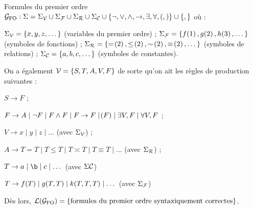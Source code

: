 \documentclass[a4paper,french,bookmarks]{book}
\begin{document}
    
    \begin{example}{Formules du premier ordre}{}
        $\mathcal{G}_\text{FO} : \Sigma = \Sigma_{\mathcal{V}} \cup \Sigma_{\mathcal{F}} \cup \Sigma_{\mathcal{R}} \cup \Sigma_{\mathcal{C}} \cup \left\{\neg, \lor, \land, \rightarrow, \exists, \forall, (, )\right\} \cup \left\{,\right\}$ où :
        \begin{enumerate}
            \itt $\Sigma_{\mathcal{V}} = \left\{x, y, z, \dots\right\}$ (variables du premier ordre) ;
            \itt $\Sigma_{\mathcal{F}} = \left\{f \!\left(1\right), g\!\left(2\right), h\!\left(3\right), \dots\right\}$ (symboles de fonctions) ;
            \itt $\Sigma_\bcR = \ens{= \p{2}, \leq \p{2}, \asymp \p{2}, \equiv \p{2}, \dots}$ (symboles de relations) ;
            \itt $\Sigma_{\mathcal{C}} = \left\{a, b, c, \dots\right\}$ (symboles de constantes).
        \end{enumerate}
        On a également $\mathcal{V} = \left\{S, T, A, V, F\right\}$ de sorte qu'on ait les règles de production suivantes :
        \begin{enumerate}
            \itt $S \rightarrow F$ ;
            
            \itt $F \rightarrow A \mid \neg F \mid F \land F \mid F \rightarrow F \mid \!\left(F\right) \mid \exists V, F \mid \forall V, F$ ;
            
            \itt $V \rightarrow x \mid y \mid z \mid \dots$ (avec $\Sigma_{\mathcal{V}}$) ;
            
            \itt $A \rightarrow T = T \mid T \leq T \mid T \asymp T \mid T \equiv T \mid \dots$ (avec $\Sigma_{\mathcal{R}}$) ;
            
            \itt $T \rightarrow a \mid \b \mid c \mid \dots$ (avec $\Sigma\mathcal{C}$)
            
            \itt $T \rightarrow f\!\left(T\right) \mid g\!\left(T, T\right) \mid k\!\left(T, T, T\right) \mid \dots$ (avec $\Sigma_{\mathcal{F}}$)
        \end{enumerate}
        Dès lors, $\mathcal{L}\!\left(\mathcal{G}_\text{FO}\right) = \left\{\text{formules du premier ordre syntaxiquement correctes}\right\}$.
    \end{example}
\end{document}
